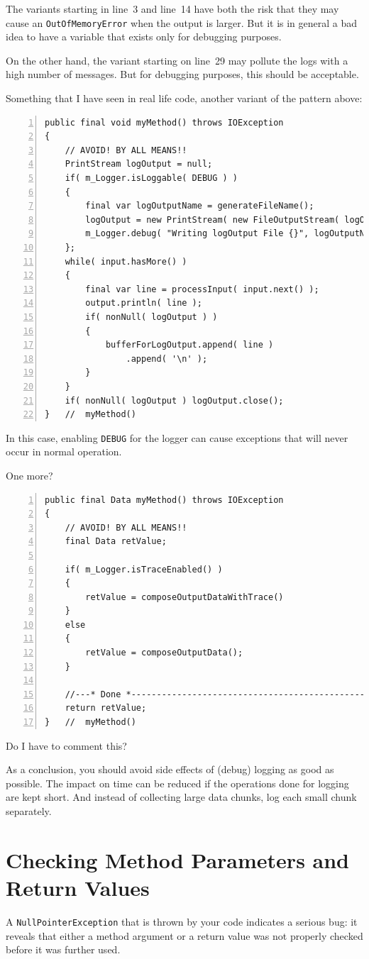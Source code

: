 \documentclass[11pt,a4paper, titlepage, parskip=half, headsepline, footsepline, cleardoublepage=current, headheight=1cm]{scrbook}
\begin{document}
The variants starting in line~3 and line~14 have both the risk that they may cause an \lstinline|OutOfMemoryError| when the output is larger. But it is in general a bad idea to have a variable that exists only for debugging purposes.

On the other hand, the variant starting on line~29 may pollute the logs with a high number of messages. But for debugging purposes, this should be acceptable.

Something that I have seen in real life code, another variant of the pattern above:
\begin{lstlisting}[numbers=left]
public final void myMethod() throws IOException
{
    // AVOID! BY ALL MEANS!!
    PrintStream logOutput = null;
    if( m_Logger.isLoggable( DEBUG ) )
    {
    	final var logOutputName = generateFileName();
    	logOutput = new PrintStream( new FileOutputStream( logOutputName ) );
    	m_Logger.debug( "Writing logOutput File {}", logOutputName );
    };
    while( input.hasMore() )
    {
        final var line = processInput( input.next() );
        output.println( line );
        if( nonNull( logOutput ) )
        {
        	bufferForLogOutput.append( line )
            	.append( '\n' );
        }
    }
    if( nonNull( logOutput ) logOutput.close();
}   //  myMethod()
\end{lstlisting}

In this case, enabling \verb#DEBUG# for the logger can cause exceptions that will never occur in normal operation.

One more?
\begin{lstlisting}[numbers=left]
public final Data myMethod() throws IOException
{
    // AVOID! BY ALL MEANS!!
    final Data retValue;
    
    if( m_Logger.isTraceEnabled() )
    {
        retValue = composeOutputDataWithTrace()
    }
    else
    {
        retValue = composeOutputData();
    }
    
    //---* Done *----------------------------------------------------
    return retValue;
}   //  myMethod()
\end{lstlisting}
Do I have to comment this?

As a conclusion, you should avoid side effects of (debug) logging as good as possible. The impact on time can be reduced if the operations done for logging are kept short. And instead of collecting large data chunks, log each small chunk separately.

\section{Checking Method Parameters and Return Values}\label{sec:CheckingMethodParametersAndReturnValues}
A \lstinline|NullPointerException| that is thrown by your code indicates a serious bug: it reveals that either a method argument or a return value was not properly checked before it was further used.
\end{document}
